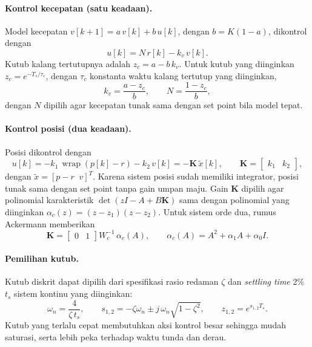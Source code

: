 \documentclass[11pt,a4paper]{article}
\begin{document}
\paragraph{Kontrol kecepatan (satu keadaan).} Model kecepatan $v[k+1] = a\,v[k] + b\,u[k]$, dengan $b = K(1-a)$, dikontrol dengan
\begin{equation}
u[k] = N\,r[k] - k_v\,v[k].
\label{eq:pp_kecepatan}
\end{equation}
Kutub kalang tertutupnya adalah $z_c = a - b\,k_v$. Untuk kutub yang diinginkan $z_c = e^{-T_s/\tau_c}$, dengan $\tau_c$ konstanta waktu kalang tertutup yang diinginkan,
\begin{equation}
k_v = \frac{a - z_c}{b},
\qquad
N = \frac{1 - z_c}{b},
\label{eq:gain_kecepatan}
\end{equation}
dengan $N$ dipilih agar kecepatan tunak sama dengan set point bila model tepat.

\paragraph{Kontrol posisi (dua keadaan).} Posisi dikontrol dengan
\begin{equation}
u[k] = -k_1\,\operatorname{wrap}\!\left(p[k] - r\right) - k_2\,v[k] = -\mathbf{K}\,\tilde{x}[k],
\qquad \mathbf{K} = \begin{bmatrix} k_1 & k_2 \end{bmatrix},
\label{eq:pp_posisi}
\end{equation}
dengan $\tilde{x} = [p - r \;\; v]^T$. Karena sistem posisi sudah memiliki integrator, posisi tunak sama dengan set point tanpa gain umpan maju. Gain $\mathbf{K}$ dipilih agar polinomial karakteristik $\det(zI - A + B\mathbf{K})$ sama dengan polinomial yang diinginkan $\alpha_c(z) = (z - z_1)(z - z_2)$. Untuk sistem orde dua, rumus Ackermann memberikan
\begin{equation}
\mathbf{K} = \begin{bmatrix} 0 & 1 \end{bmatrix} W_c^{-1}\,\alpha_c(A),
\qquad
\alpha_c(A) = A^2 + \alpha_1 A + \alpha_0 I.
\label{eq:ackermann}
\end{equation}

\paragraph{Pemilihan kutub.} Kutub diskrit dapat dipilih dari spesifikasi rasio redaman $\zeta$ dan \textit{settling time} 2\% $t_s$ sistem kontinu yang diinginkan:
\begin{equation}
\omega_n = \frac{4}{\zeta\,t_s},
\qquad
s_{1,2} = -\zeta\omega_n \pm j\,\omega_n\sqrt{1-\zeta^2},
\qquad
z_{1,2} = e^{s_{1,2} T_s}.
\label{eq:kutub}
\end{equation}
Kutub yang terlalu cepat membutuhkan aksi kontrol besar sehingga mudah saturasi, serta lebih peka terhadap waktu tunda dan derau.
\end{document}

